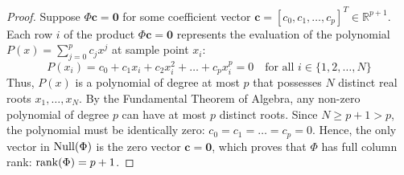 \begin{proof}
Suppose $\Phi \mathbf{c} = \mathbf{0}$ for some coefficient vector $\mathbf{c} = [c_0, c_1, \dots, c_p]^T \in \mathbb{R}^{p+1}$.
Each row $i$ of the product $\Phi \mathbf{c} = \mathbf{0}$ represents the evaluation of the polynomial $P(x) = \sum_{j=0}^p c_j x^j$ at sample point $x_i$:
\begin{equation}
P(x_i) = c_0 + c_1 x_i + c_2 x_i^2 + \dots + c_p x_i^p = 0 \quad \text{for all } i \in \{1, 2, \dots, N\}
\end{equation}
Thus, $P(x)$ is a polynomial of degree at most $p$ that possesses $N$ distinct real roots $x_1, \dots, x_N$.
By the Fundamental Theorem of Algebra, any non-zero polynomial of degree $p$ can have at most $p$ distinct roots. Since $N \ge p + 1 > p$, the polynomial must be identically zero: $c_0 = c_1 = \dots = c_p = 0$.
Hence, the only vector in $\operatorname{Null}(\Phi)$ is the zero vector $\mathbf{c} = \mathbf{0}$, which proves that $\Phi$ has full column rank: $\operatorname{rank}(\Phi) = p + 1$.
\end{proof}

